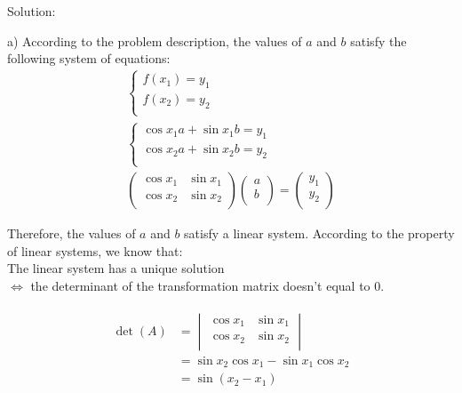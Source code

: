 \documentclass{article}
\begin{document}
Solution:

a)
According to the problem description, the values of $a$ and $b$ satisfy the 
following system of equations:
\begin{gather*}
  \begin{cases}
    f(x_1) = y_1 \\
    f(x_2) = y_2 \\
  \end{cases} \\
  \begin{cases}
    \cos x_1 a + \sin x_1 b = y_1 \\
    \cos x_2 a + \sin x_2 b = y_2 \\
  \end{cases} \\
  \begin{pmatrix}
    \cos x_1 & \sin x_1 \\
    \cos x_2 & \sin x_2 \\
  \end{pmatrix}
  \begin{pmatrix}
    a \\
    b \\
  \end{pmatrix} = 
  \begin{pmatrix}
    y_1 \\
    y_2 \\
  \end{pmatrix}
\end{gather*}

Therefore, the values of $a$ and $b$ satisfy a linear system. According to the 
property of linear systems, we know that: \\
The linear system has a unique solution \\
$\iff$ the determinant of the transformation matrix doesn't equal to 0.

\begin{gather*}
  \begin{split}
    \det(A) 
    &= \begin{vmatrix}
         \cos x_1 & \sin x_1 \\
         \cos x_2 & \sin x_2 \\
       \end{vmatrix} \\
    &= \sin x_2 \cos x_1 - \sin x_1 \cos x_2 \\
    &= \sin(x_2 - x_1) \\
  \end{split}
\end{gather*}
\end{document}
